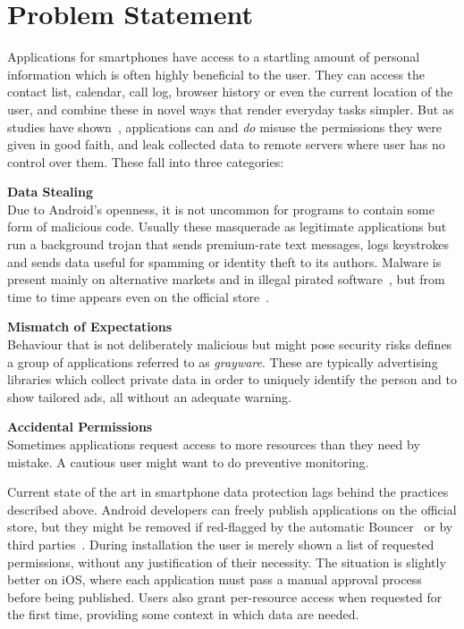 \documentclass[12pt,twoside,notitlepage]{report}
\begin{document}
\section{Problem Statement}

Applications for smartphones have access to a startling amount of personal information which is often highly beneficial to the user. They can access the contact list, calendar, call log, browser history or even the current location of the user, and combine these in novel ways that render everyday tasks simpler. But as studies have shown~\cite{web:Appthority, web:HuffingtonOneInThree}, applications can and \emph{do} misuse the permissions they were given in good faith, and leak collected data to remote servers where user has no control over them. These fall into three categories:
\begin{description}
\item \textbf{Data Stealing} \\
Due to Android's openness, it is not uncommon for programs to contain some form of malicious code. Usually these masquerade as legitimate applications but run a background trojan that sends premium-rate text messages, logs keystrokes and sends data useful for spamming or identity theft to its authors. Malware is present mainly on alternative markets and in illegal pirated software~\cite{Zhou:2012:DRS:2133601.2133640}, but from time to time appears even on the official store~\cite{web:LookoutPlayRemoval}.

\item \textbf{Mismatch of Expectations} \\
Behaviour that is not deliberately malicious but might pose security risks defines a group of applications referred to as \emph{grayware}. These are typically advertising libraries which collect private data in order to uniquely identify the person and to show tailored ads, all without an adequate warning.

\item \textbf{Accidental Permissions} \\
Sometimes applications request access to more resources than they need by mistake. A cautious user might want to do preventive monitoring. 
\end{description}

Current state of the art in smartphone data protection lags behind the practices described above. Android developers can freely publish applications on the official store, but they might be removed if red-flagged by the automatic Bouncer~\cite{web:Bouncer} or by third parties~\cite{web:LookoutPlayRemoval}. During installation the user is merely shown a list of requested permissions, without any justification of their necessity. The situation is slightly better on iOS, where each application must pass a manual approval process before being published. Users also grant per-resource access when requested for the first time, providing some context in which data are needed.
\end{document}
